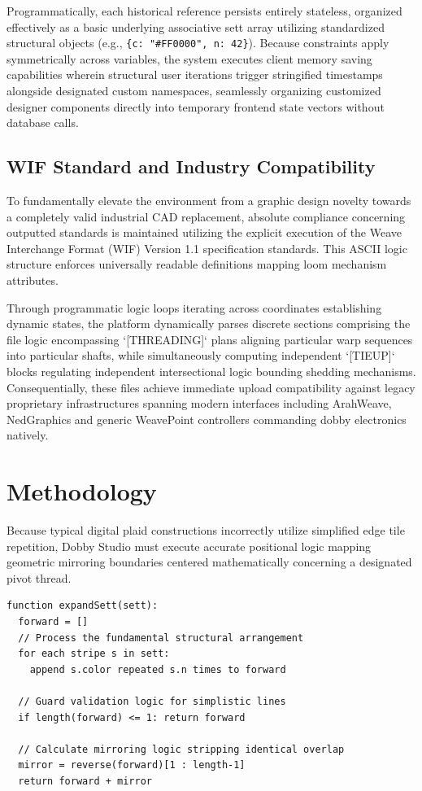 Programmatically, each historical reference persists entirely stateless, organized effectively as a basic underlying associative sett array utilizing standardized structural objects (e.g., \texttt{\{c: "\#FF0000", n: 42\}}). Because constraints apply symmetrically across variables, the system executes client memory saving capabilities wherein structural user iterations trigger stringified timestamps alongside designated custom namespaces, seamlessly organizing customized designer components directly into temporary frontend state vectors without database calls.

\subsection{WIF Standard and Industry Compatibility}
To fundamentally elevate the environment from a graphic design novelty towards a completely valid industrial CAD replacement, absolute compliance concerning outputted standards is maintained utilizing the explicit execution of the Weave Interchange Format (WIF) Version 1.1 specification standards. This ASCII logic structure enforces universally readable definitions mapping loom mechanism attributes.

Through programmatic logic loops iterating across coordinates establishing dynamic states, the platform dynamically parses discrete sections comprising the file logic encompassing `[THREADING]` plans aligning particular warp sequences into particular shafts, while simultaneously computing independent `[TIEUP]` blocks regulating independent intersectional logic bounding shedding mechanisms. Consequentially, these files achieve immediate upload compatibility against legacy proprietary infrastructures spanning modern interfaces including ArahWeave, NedGraphics and generic WeavePoint controllers commanding dobby electronics natively.

\section{Methodology}

Because typical digital plaid constructions incorrectly utilize simplified edge tile repetition, Dobby Studio must execute accurate positional logic mapping geometric mirroring boundaries centered mathematically concerning a designated pivot thread.

\begin{verbatim}
function expandSett(sett):
  forward = []
  // Process the fundamental structural arrangement
  for each stripe s in sett:
    append s.color repeated s.n times to forward
  
  // Guard validation logic for simplistic lines
  if length(forward) <= 1: return forward
  
  // Calculate mirroring logic stripping identical overlap
  mirror = reverse(forward)[1 : length-1]
  return forward + mirror
\end{verbatim}


